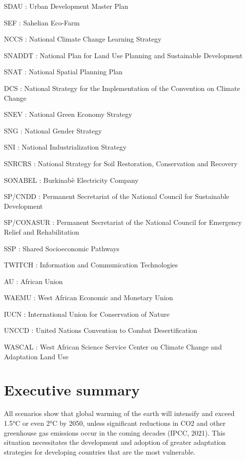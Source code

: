 \documentclass[
]{book}
\begin{document}
SDAU : Urban Development Master Plan

SEF : Sahelian Eco-Farm

NCCS : National Climate Change Learning Strategy

SNADDT : National Plan for Land Use Planning and Sustainable Development

SNAT : National Spatial Planning Plan

DCS : National Strategy for the Implementation of the Convention on Climate Change

SNEV : National Green Economy Strategy

SNG : National Gender Strategy

SNI : National Industrialization Strategy

SNRCRS : National Strategy for Soil Restoration, Conservation and Recovery

SONABEL : Burkinabè Electricity Company

SP/CNDD : Permanent Secretariat of the National Council for Sustainable Development

SP/CONASUR : Permanent Secretariat of the National Council for Emergency Relief and Rehabilitation

SSP : Shared Socioeconomic Pathways

TWITCH : Information and Communication Technologies

AU : African Union

WAEMU : West African Economic and Monetary Union

IUCN : International Union for Conservation of Nature

UNCCD : United Nations Convention to Combat Desertification

WASCAL : West African Science Service Center on Climate Change and Adaptation Land Use

\section*{Executive summary}\label{executive-summary}

All scenarios show that global warming of the earth will intensify and exceed 1.5°C or even 2°C by 2050, unless significant reductions in CO2 and other greenhouse gas emissions occur in the coming decades (IPCC, 2021). This situation necessitates the development and adoption of greater adaptation strategies for developing countries that are the most vulnerable.
\end{document}
